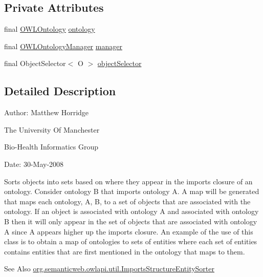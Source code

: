 \subsection*{Private Attributes}
\begin{DoxyCompactItemize}
\item 
final \hyperlink{interfaceorg_1_1semanticweb_1_1owlapi_1_1model_1_1_o_w_l_ontology}{O\-W\-L\-Ontology} \hyperlink{classorg_1_1semanticweb_1_1owlapi_1_1util_1_1_imports_structure_object_sorter_3_01_o_01_4_a466a7e19b6fa657a7079ec9ed7860bf7}{ontology}
\item 
final \hyperlink{interfaceorg_1_1semanticweb_1_1owlapi_1_1model_1_1_o_w_l_ontology_manager}{O\-W\-L\-Ontology\-Manager} \hyperlink{classorg_1_1semanticweb_1_1owlapi_1_1util_1_1_imports_structure_object_sorter_3_01_o_01_4_ad8a5c404d626fa738269445cabeff0ab}{manager}
\item 
final Object\-Selector$<$ O $>$ \hyperlink{classorg_1_1semanticweb_1_1owlapi_1_1util_1_1_imports_structure_object_sorter_3_01_o_01_4_a077c2ab985aad81ca5611731ccfcda4a}{object\-Selector}
\end{DoxyCompactItemize}


\subsection{Detailed Description}
Author\-: Matthew Horridge\par
 The University Of Manchester\par
 Bio-\/\-Health Informatics Group\par
 Date\-: 30-\/\-May-\/2008\par
\par


Sorts objects into sets based on where they appear in the imports closure of an ontology. Consider ontology B that imports ontology A. A map will be generated that maps each ontology, A, B, to a set of objects that are associated with the ontology. If an object is associated with ontology A and associated with ontology B then it will only appear in the set of objects that are associated with ontology A since A appears higher up the imports closure. An example of the use of this class is to obtain a map of ontologies to sets of entities where each set of entities contains entities that are first mentioned in the ontology that maps to them.

\begin{DoxySeeAlso}{See Also}
\hyperlink{classorg_1_1semanticweb_1_1owlapi_1_1util_1_1_imports_structure_entity_sorter}{org.\-semanticweb.\-owlapi.\-util.\-Imports\-Structure\-Entity\-Sorter} 
\end{DoxySeeAlso}

